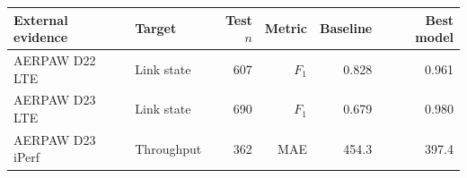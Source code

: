 \begin{tabular}{llrrrr}
\toprule
External evidence & Target & Test $n$ & Metric & Baseline & Best model \\
\midrule
AERPAW D22 LTE & Link state & 607 & $F_1$ & 0.828 & 0.961 \\
AERPAW D23 LTE & Link state & 690 & $F_1$ & 0.679 & 0.980 \\
AERPAW D23 iPerf & Throughput & 362 & MAE & 454.3 & 397.4 \\
\bottomrule
\end{tabular}
